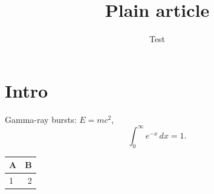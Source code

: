 \documentclass{article}
\title{Plain article}\author{Test}
\begin{document}
\maketitle
\section{Intro} Gamma-ray bursts: $E=mc^2$, \[\int_0^\infty e^{-x}\,dx = 1.\]
\begin{table}[h]\centering\begin{tabular}{lr}\toprule A & B\\\midrule 1 & 2\\\bottomrule\end{tabular}\end{table}
\end{document}
